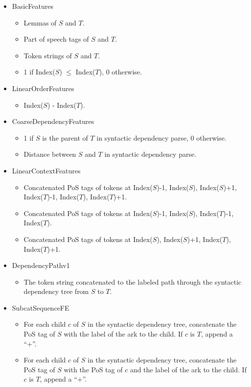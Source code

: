 \documentclass[11pt]{article}
\begin{document}
\begin{itemize}
\item BasicFeatures
\begin{itemize}
\item Lemmas of $S$ and $T$.
\item Part of speech tags of $S$ and $T$.
\item Token strings of $S$ and $T$.
\item 1 if Index($S$) $\le$ Index($T$), 0 otherwise.
\end{itemize}
\item LinearOrderFeatures
\begin{itemize}
\item Index($S$) - Index($T$).
\end{itemize}
\item CoarseDependencyFeatures
\begin{itemize}
\item 1 if $S$ is the parent of $T$ in syntactic dependency parse, 0 otherwise.
\item Distance between $S$ and $T$ in syntactic dependency parse.
\end{itemize}
\item LinearContextFeatures
\begin{itemize}
\item Concatenated PoS tags of tokens at Index($S$)-1, Index($S$), Index($S$)+1, Index($T$)-1, Index($T$), Index($T$)+1.
\item Concatenated PoS tags of tokens at Index($S$)-1, Index($S$), Index($T$)-1, Index($T$).
\item Concatenated PoS tags of tokens at Index($S$), Index($S$)+1, Index($T$), Index($T$)+1.
\end{itemize}
\item DependencyPathv1
\begin{itemize}
\item The token string concatenated to the labeled path through the syntactic dependency tree from $S$ to $T$.
\end{itemize}
\item SubcatSequenceFE
\begin{itemize}
\item For each child $c$ of $S$ in the syntactic dependency tree, concatenate the PoS tag of $S$ with the label of the ark to the child. If $c$ is $T$, append a ``+''.
\item For each child $c$ of $S$ in the syntactic dependency tree, concatenate the PoS tag of $S$ with the PoS tag of $c$ and the label of the ark to the child. If $c$ is $T$, append a ``+''.

\end{itemize}
\end{itemize}
\end{document}
